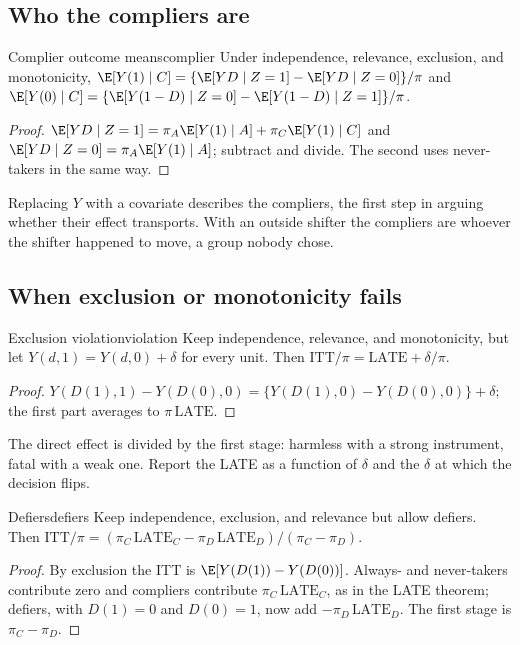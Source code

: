 \documentclass[11pt]{article}
\begin{document}
\subsection{Who the compliers are}

\begin{prop}{Complier outcome means}{complier}
Under independence, relevance, exclusion, and monotonicity,
$\E[Y(1) \mid C] = \{\E[YD \mid Z=1] - \E[YD \mid Z=0]\}/\pi$ and $\E[Y(0) \mid C] = \{\E[Y(1-D) \mid Z=0] - \E[Y(1-D) \mid Z=1]\}/\pi$.
\end{prop}
\begin{proof}
$\E[YD \mid Z=1] = \pi_A\E[Y(1) \mid A] + \pi_C\E[Y(1) \mid C]$ and $\E[YD \mid Z=0] = \pi_A\E[Y(1) \mid A]$; subtract and divide. The second uses
never-takers in the same way.
\end{proof}

Replacing $Y$ with a covariate describes the compliers, the first step in arguing whether their effect transports. With an
outside shifter the compliers are whoever the shifter happened to move, a group nobody chose.

\subsection{When exclusion or monotonicity fails}

\begin{prop}{Exclusion violation}{violation}
Keep independence, relevance, and monotonicity, but let $Y(d,1) = Y(d,0) + \delta$ for every unit. Then
$\text{ITT}/\pi = \text{LATE} + \delta/\pi$.
\end{prop}
\begin{proof}
$Y(D(1),1) - Y(D(0),0) = \{Y(D(1),0) - Y(D(0),0)\} + \delta$; the first part averages to $\pi\,\text{LATE}$.
\end{proof}

The direct effect is divided by the first stage: harmless with a strong instrument, fatal with a weak one. Report the LATE as a
function of $\delta$ and the $\delta$ at which the decision flips.

\begin{prop}{Defiers}{defiers}
Keep independence, exclusion, and relevance but allow defiers. Then
$\text{ITT}/\pi = (\pi_C\,\text{LATE}_C - \pi_D\,\text{LATE}_D)/(\pi_C - \pi_D)$.
\end{prop}
\begin{proof}
By exclusion the ITT is $\E[Y(D(1)) - Y(D(0))]$. Always- and never-takers contribute zero and compliers contribute
$\pi_C\,\text{LATE}_C$, as in the LATE theorem; defiers, with $D(1) = 0$ and $D(0) = 1$, now add $-\pi_D\,\text{LATE}_D$. The
first stage is $\pi_C - \pi_D$.
\end{proof}
\end{document}
